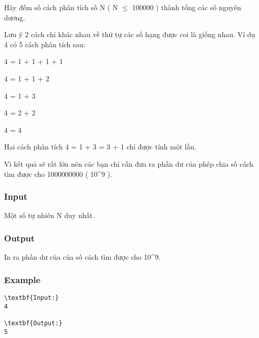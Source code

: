 



   Hãy đếm số cách phân tích số N ( N $\le$ 100000 ) thành tổng các số nguyên dương.   


   Lưu ý 2 cách chỉ khác nhau về thứ tự các số hạng được coi là giống nhau. Ví dụ 4 có 5 cách phân tích sau:   


   4 = 1 + 1 + 1 + 1   


   4 = 1 + 1 + 2   


   4 = 1 + 3   


   4 = 2 + 2   


   4 = 4   





   Hai cách phân tích 4 = 1 + 3 = 3 + 1 chỉ được tính một lần.   


   Vì kết quả sẽ rất lớn nên các bạn chỉ cần đưa ra phần dư của phép chia số cách tìm được cho 1000000000 ( 10^9 ).  

\subsubsection{   Input  }

   Một số tự nhiên N duy nhất.  

\subsubsection{   Output  }

   In ra phần dư của của số cách tìm được cho 10^9.  

\subsubsection{   Example  }
\begin{verbatim}
\textbf{Input:}
4

\textbf{Output:}
5
\end{verbatim}
